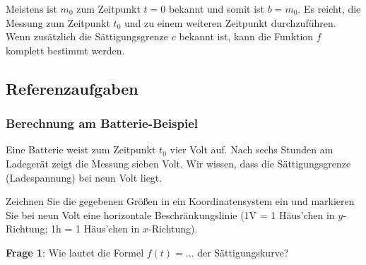 \begin{bemerkung}{}{}
Meistens ist $m_0$ zum Zeitpunkt $t=0$ bekannt und somit ist $b=m_0$. Es reicht, die Messung zum Zeitpunkt $t_0$ und zu einem weiteren Zeitpunkt durchzuführen. Wenn zusätzlich die Sättigungsgrenze $c$ bekannt ist, kann die Funktion $f$ komplett bestimmt werden.
\end{bemerkung} 

\newpage

\subsection{Referenzaufgaben}

\subsubsection{Berechnung am Batterie-Beispiel}
Eine Batterie weist zum Zeitpunkt $t_0$ vier Volt auf. Nach sechs Stunden am Ladegerät zeigt die Messung sieben Volt. Wir wissen, dass die Sättigungsgrenze (Ladespannung) bei neun Volt liegt.

Zeichnen Sie die gegebenen Größen in ein Koordinatensystem ein und markieren Sie bei neun Volt eine horizontale Beschränkungslinie (\zB 1V = 1 Häus'chen in $y$-Richtung; 1h = 1 Häus'chen in $x$-Richtung).


\textbf{Frage 1}: Wie lautet die Formel $f(t) = ...$ der Sättigungskurve?








\newpage

